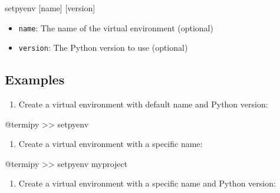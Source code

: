\documentclass[
  letterpaper,
  DIV=11,
  numbers=noendperiod]{scrreprt}
\newenvironment{Shaded}{\begin{snugshade}}{\end{snugshade}}
\newcommand{\ExtensionTok}[1]{\textcolor[rgb]{0.00,0.23,0.31}{#1}}
\newcommand{\NormalTok}[1]{\textcolor[rgb]{0.00,0.23,0.31}{#1}}
\newcommand{\OperatorTok}[1]{\textcolor[rgb]{0.37,0.37,0.37}{#1}}
\newcommand{\PreprocessorTok}[1]{\textcolor[rgb]{0.68,0.00,0.00}{#1}}
\newcommand{\SpecialStringTok}[1]{\textcolor[rgb]{0.13,0.47,0.30}{#1}}
\providecommand{\tightlist}{%
  \setlength{\itemsep}{0pt}\setlength{\parskip}{0pt}}\usepackage{longtable,booktabs,array}
\begin{document}
\begin{Shaded}
\begin{Highlighting}[]
\ExtensionTok{setpyenv} \PreprocessorTok{[}\SpecialStringTok{name}\PreprocessorTok{]} \PreprocessorTok{[}\SpecialStringTok{version}\PreprocessorTok{]}
\end{Highlighting}
\end{Shaded}

\begin{itemize}
\tightlist
\item
  \texttt{name}: The name of the virtual environment (optional)
\item
  \texttt{version}: The Python version to use (optional)
\end{itemize}

\subsection*{Examples}\label{examples}

\begin{enumerate}
\def\labelenumi{\arabic{enumi}.}
\tightlist
\item
  Create a virtual environment with default name and Python version:
\end{enumerate}

\begin{Shaded}
\begin{Highlighting}[]
\ExtensionTok{@termipy} \OperatorTok{\textgreater{}\textgreater{}}\NormalTok{ setpyenv}
\end{Highlighting}
\end{Shaded}

\begin{enumerate}
\def\labelenumi{\arabic{enumi}.}
\setcounter{enumi}{1}
\tightlist
\item
  Create a virtual environment with a specific name:
\end{enumerate}

\begin{Shaded}
\begin{Highlighting}[]
\ExtensionTok{@termipy} \OperatorTok{\textgreater{}\textgreater{}}\NormalTok{ setpyenv myproject}
\end{Highlighting}
\end{Shaded}

\begin{enumerate}
\def\labelenumi{\arabic{enumi}.}
\setcounter{enumi}{2}
\tightlist
\item
  Create a virtual environment with a specific name and Python version:
\end{enumerate}
\end{document}
